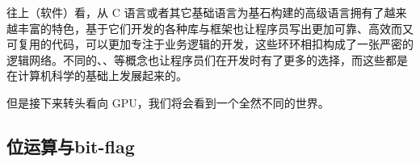往上（软件）看，从 C 语言或者其它基础语言为基石构建的高级语言拥有了越来越丰富的特色，基于它们开发的各种库与框架也让程序员写出更加可靠、高效而又可复用的代码，可以更加专注于业务逻辑的开发，这些环环相扣构成了一张严密的逻辑网络。不同的、、等概念也让程序员们在开发时有了更多的选择，而这些都是在计算机科学的基础上发展起来的。

但是接下来转头看向 GPU，我们将会看到一个全然不同的世界。

\newpage

\subsection{位运算与bit-flag}